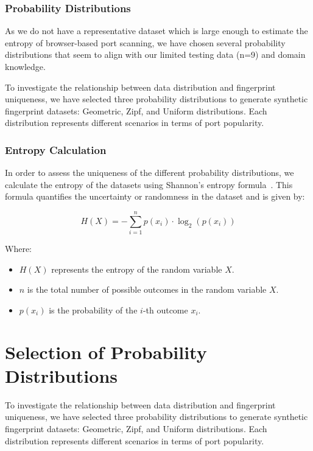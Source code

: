 \subsubsection{Probability Distributions}

As we do not have a representative dataset which is large enough to estimate the entropy of browser-based port scanning, we have chosen several probability distributions that seem to align with our limited testing data (n=9) and domain knowledge.

To investigate the relationship between data distribution and fingerprint uniqueness, we have selected three probability distributions to generate synthetic fingerprint datasets: Geometric, Zipf, and Uniform distributions. Each distribution represents different scenarios in terms of port popularity.

\subsubsection{Entropy Calculation}

In order to assess the uniqueness of the different probability distributions, we calculate the entropy of the datasets using Shannon's entropy formula~\cite{shannons_entropy}. This formula quantifies the uncertainty or randomness in the dataset and is given by:

\[
H(X) = -\sum_{i=1}^{n} p(x_i) \cdot \log_{2}(p(x_i))
\]

Where:
\begin{itemize}
  \item $H(X)$ represents the entropy of the random variable $X$.
  \item $n$ is the total number of possible outcomes in the random variable $X$.
  \item $p(x_i)$ is the probability of the $i$-th outcome $x_i$.
\end{itemize}


\section{Selection of Probability Distributions}

To investigate the relationship between data distribution and fingerprint uniqueness, we have selected three probability distributions to generate synthetic fingerprint datasets: Geometric, Zipf, and Uniform distributions. Each distribution represents different scenarios in terms of port popularity.

